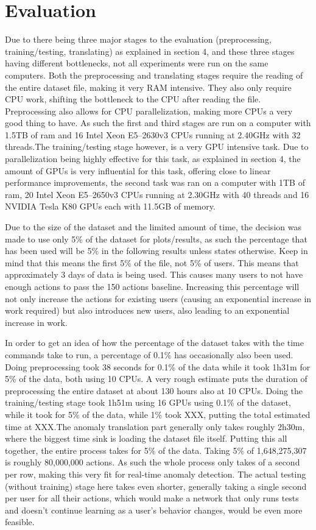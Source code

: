 \chapter{Evaluation}\label{ch:evaluation}

Due to there being three major stages to the evaluation (preprocessing, training/testing, translating) as explained in section 4, and these three stages having different bottlenecks, not all experiments were run on the same computers. Both the preprocessing and translating stages require the reading of the entire dataset file, making it very RAM intensive. They also only require CPU work, shifting the bottleneck to the CPU after reading the file. Preprocessing also allows for CPU parallelization, making more CPUs a very good thing to have. As such the first and third stages are run on a computer with 1.5TB of ram and 16 Intel Xeon E5--2630v3 CPUs running at 2.40GHz with 32 threads.The training/testing stage however, is a very GPU intensive task. Due to parallelization being highly effective for this task, as explained in section 4, the amount of GPUs is very influential for this task, offering close to linear performance improvements, the second task was ran on a computer with 1TB of ram, 20 Intel Xeon E5--2650v3 CPUs running at 2.30GHz with 40 threads and 16 NVIDIA Tesla K80 GPUs each with 11.5GB of memory. 

Due to the size of the dataset and the limited amount of time, the decision was made to use only 5\% of the dataset for plots/results, as such the percentage that has been used will be 5\% in the following results unless states otherwise. Keep in mind that this means the first 5\% of the file, not 5\% of users. This means that approximately 3 days of data is being used. This causes many users to not have enough actions to pass the 150 actions baseline. Increasing this percentage will not only increase the actions for existing users (causing an exponential increase in work required) but also introduces new users, also leading to an exponential increase in work. 

In order to get an idea of how the percentage of the dataset takes with the time commands take to run, a percentage of 0.1\% has occasionally also been used. Doing preprocessing took 38 seconds for 0.1\% of the data while it took 1h31m for 5\% of the data, both using 10 CPUs. A very rough estimate puts the duration of preprocessing the entire dataset at about 130 hours also at 10 CPUs. Doing the training/testing stage took 1h51m using 16 GPUs using 0.1\% of the dataset, while it took %
for 5\% of the data,
while 1\% took XXX, putting the total estimated time at XXX.\@ The anomaly translation part generally only takes roughly 2h30m, where the biggest time sink is loading the dataset file itself. Putting this all together, the entire process takes %
for 5\% of the data. Taking 5\% of 1,648,275,307 is roughly 80,000,000 actions. As such the whole process only takes %
of a second per row, making this very fit for real-time anomaly detection. The actual testing (without training) stage here takes even shorter, generally taking a single second per user for all their actions, which would make a network that only runs tests and doesn't continue learning as a user's behavior changes, would be even more feasible.